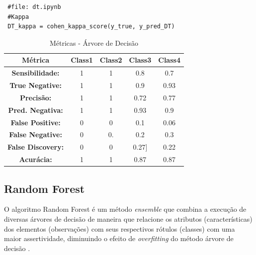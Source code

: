 \documentclass[
	article,			%
	11pt,				%
	oneside,			%
	a4paper,			%
	english,			%
	brazil,				%
	sumario=tradicional
	]{abntex2}
\begin{document}
\begin{verbatim}
 #file: dt.ipynb
 #Kappa
 DT_kappa = cohen_kappa_score(y_true, y_pred_DT)
\end{verbatim}

\begin{table}[H]
\centering
\begin{tabular}{|c|c|c|c|c|}
\hline
\textbf{Métrica}         & \textbf{Class1} & \textbf{Class2} & \textbf{Class3} & \textbf{Class4} \\ \hline
\textbf{Sensibilidade:}  & 1               & 1               & 0.8             & 0.7             \\ \hline
\textbf{True Negative:}  & 1               & 1               & 0.9             & 0.93            \\ \hline
\textbf{Precisão:}       & 1               & 1               & 0.72            & 0.77            \\ \hline
\textbf{Pred. Negativa:} & 1               & 1               & 0.93            & 0.9             \\ \hline
\textbf{False Positive:} & 0               & 0               & 0.1             & 0.06            \\ \hline
\textbf{False Negative:} & 0               & 0.              & 0.2             & 0.3             \\ \hline
\textbf{False Discovery:}    & 0               & 0               & 0.27{]}         & 0.22            \\ \hline
\textbf{Acurácia:}       & 1               & 1               & 0.87            & 0.87            \\ \hline
\end{tabular}
\caption{Métricas - Árvore de Decisão}
\label{tab:metrics_dt}
\end{table}

\newpage
\subsection{Random Forest}

O algoritmo Random Forest é um método \textit{ensemble} que combina a execução de diversas árvores de decisão de maneira que relacione os atributos (características) dos elementos (observações) com seus respectivos rótulos (classes) com uma maior assertividade, diminuindo o efeito de \textit{overfitting} do método árvore de decisão \cite{Igual2017}.
\end{document}

